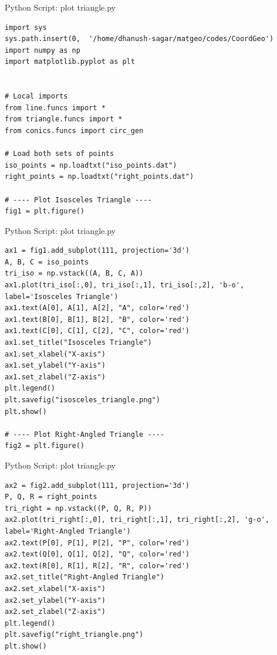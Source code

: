 \documentclass{beamer}
\numberwithin{equation}{section}
\theoremstyle{remark}
\begin{document}
\begin{frame}[fragile]{Python Script: plot triangle.py}
\begin{verbatim}
import sys
sys.path.insert(0,  '/home/dhanush-sagar/matgeo/codes/CoordGeo')
import numpy as np
import matplotlib.pyplot as plt


# Local imports
from line.funcs import *
from triangle.funcs import *
from conics.funcs import circ_gen

# Load both sets of points
iso_points = np.loadtxt("iso_points.dat")
right_points = np.loadtxt("right_points.dat")

# ---- Plot Isosceles Triangle ----
fig1 = plt.figure()
\end{verbatim}
\end{frame}
\begin{frame}[fragile]{Python Script: plot triangle.py}
\begin{verbatim}
ax1 = fig1.add_subplot(111, projection='3d')
A, B, C = iso_points
tri_iso = np.vstack((A, B, C, A))
ax1.plot(tri_iso[:,0], tri_iso[:,1], tri_iso[:,2], 'b-o', label='Isosceles Triangle')
ax1.text(A[0], A[1], A[2], "A", color='red')
ax1.text(B[0], B[1], B[2], "B", color='red')
ax1.text(C[0], C[1], C[2], "C", color='red')
ax1.set_title("Isosceles Triangle")
ax1.set_xlabel("X-axis")
ax1.set_ylabel("Y-axis")
ax1.set_zlabel("Z-axis")
plt.legend()
plt.savefig("isosceles_triangle.png")
plt.show()

# ---- Plot Right-Angled Triangle ----
fig2 = plt.figure()
\end{verbatim}
\end{frame}
\begin{frame}[fragile]{Python Script: plot triangle.py}
\begin{verbatim}
ax2 = fig2.add_subplot(111, projection='3d')
P, Q, R = right_points
tri_right = np.vstack((P, Q, R, P))
ax2.plot(tri_right[:,0], tri_right[:,1], tri_right[:,2], 'g-o', label='Right-Angled Triangle')
ax2.text(P[0], P[1], P[2], "P", color='red')
ax2.text(Q[0], Q[1], Q[2], "Q", color='red')
ax2.text(R[0], R[1], R[2], "R", color='red')
ax2.set_title("Right-Angled Triangle")
ax2.set_xlabel("X-axis")
ax2.set_ylabel("Y-axis")
ax2.set_zlabel("Z-axis")
plt.legend()
plt.savefig("right_triangle.png")
plt.show()


\end{verbatim}
\end{frame}
\end{document}
